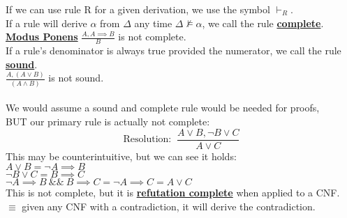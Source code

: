 \documentclass[../../lecture_notes.tex]{subfiles}
\begin{document}
\noindent If we can use rule R for a given derivation, we use the symbol $\vdash_R$.\\
If a rule will derive $\alpha$ from $\Delta$ any time $\Delta \not\models \alpha$, 
	we call the rule \textbf{\underline{complete}}.\\
\indent \textbf{\underline{Modus Ponens}} $\frac{A, A\implies B}  {B}$ is not complete.\\
If a rule’s denominator is always true provided the numerator, we call the rule \textbf{\underline{sound}}.\\
\indent $\frac {A, (A \lor B)} {(A \land B)}$ is not sound.\\
\\
We would assume a sound and complete rule would be needed for proofs, \\
\indent BUT our primary rule is actually not complete:
\begin{equation*} \text{Resolution: } \ \frac{A \lor B, \neg B \lor C } {A \lor C} \end{equation*}
This may be counterintuitive, but we can see it holds:\\
	\indent $A \lor B = \neg A \implies B$\\
	\indent $\neg B \lor C = B \implies C$\\
	\indent $\neg A \implies B \ \&\&\  B \implies C = \neg A \implies C = A \lor C$\\
This is not complete, but it is \textbf{\underline{refutation complete}} when applied to a CNF.\\
\indent $\equiv$ given any CNF with a contradiction, it will derive the contradiction.\\
\end{document}
